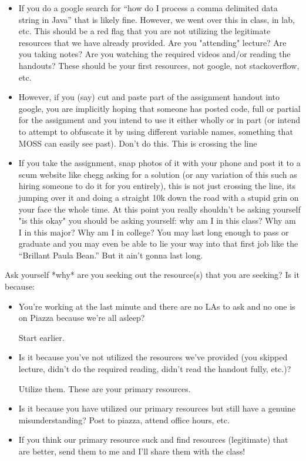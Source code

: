 \documentclass[12pt]{scrartcl}
\begin{document}
\begin{itemize}
  \item If you do a google search for ``how do I process a comma 
  delimited data string in Java'' that is likely fine.  However, 
  we went over this in class, in lab, etc.  This should be a red 
  flag that you are not utilizing the legitimate resources that 
  we have already provided.  Are you "attending" lecture?  Are 
  you taking notes?  Are you watching the required videos and/or 
  reading the handouts?  These should be your first resources, 
  not google, not stackoverflow, etc.
  \item However, if you (say) cut and paste part of the assignment 
  handout into google, you are implicitly hoping that someone has 
  posted code, full or partial for the assignment and you intend 
  to use it either wholly or in part (or intend to attempt to 
  obfuscate it by using different variable names, something that 
  MOSS can easily see past).  Don't do this.  This is crossing the line
  \item If you take the assignment, snap photos of it with your 
  phone and post it to a scum website like chegg asking for a 
  solution (or any variation of this such as hiring someone to do 
  it for you entirely), this is not just crossing the line, its 
  jumping over it and doing a straight 10k down the road with a 
  stupid grin on your face the whole time.  At this point you 
  really shouldn't be asking yourself "is this okay" you should 
  be asking yourself: why am I in this class?  Why am I in this 
  major?  Why am I in college?  You may last long enough to pass 
  or graduate and you may even be able to lie your way into that 
  first job like the ``Brillant Paula Bean.''  But it ain't 
  gonna last long.
\end{itemize}

Ask yourself *why* are you seeking out the resource(s) that you 
are seeking?  Is it because:

\begin{itemize}
  \item You're working at the last minute and there are no LAs 
  to ask and no one is on Piazza because we're all asleep?  
  
  Start earlier.
  
  \item Is it because you've not utilized the resources we've 
  provided (you skipped lecture, didn't do the required reading, 
  didn't read the handout fully, etc.)?  
  
  Utilize them.  These are your primary resources.
  
  \item Is it because you have utilized our primary resources 
  but still have a genuine misunderstanding?  Post to piazza, 
  attend office hours, etc. 
  
  \item If you think our primary resource suck and find resources 
  (legitimate) that are better, send them to me and I'll share 
  them with the class!
\end{itemize}
\end{document}
